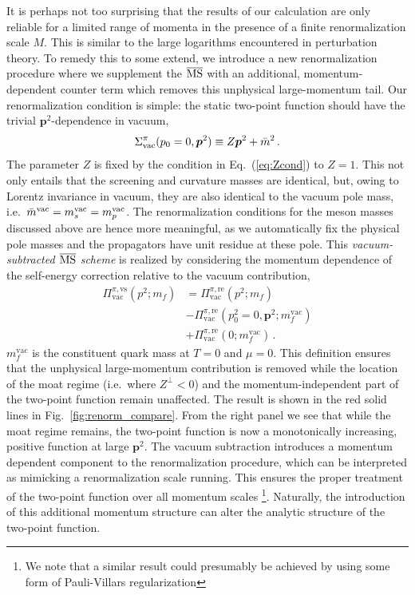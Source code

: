\documentclass[reprint,english,superscriptaddress,preprintnumbers,amsmath,amssymb,aps,prd]{revtex4-2}
\def\Eq#1{Eq.~(\ref{#1})}
\def\Fig#1{Fig.~\ref{#1}}
\begin{document}
It is perhaps not too surprising that the results of our calculation are only reliable for a limited range of momenta in the presence of a finite renormalization scale $M$. This is similar to the large logarithms encountered in perturbation theory. To remedy this to some extend, we introduce a new renormalization procedure where we supplement the $\overline{\rm MS}$ with an additional, momentum-dependent counter term which removes this unphysical large-momentum tail. Our renormalization condition is simple: the static two-point function should have the trivial $\boldsymbol{p}^2$-dependence in vacuum,
\begin{align}\label{eq:rc2}
    \Sigma_{\rm vac}^\pi(p_0 = 0, \boldsymbol{p}^2) \equiv Z \boldsymbol{p}^2 + \bar m^2\,.
\end{align}
The parameter $Z$ is fixed by the condition in \Eq{eq:Zcond} to $Z=1$.
This not only entails that the screening and curvature masses are identical, but, owing to Lorentz invariance in vacuum, they are also identical to the vacuum pole mass, i.e.\ $\bar m^{\rm vac} = m_s^{\rm vac} = m_p^{\rm vac}$. The renormalization conditions for the meson masses discussed above are hence more meaningful, as we automatically fix the physical pole masses and the propagators have unit residue at these pole. This \emph{vacuum-subtracted $\overline{\rm MS}$ scheme} is realized by considering the momentum dependence of the self-energy correction relative to the vacuum contribution,
%
\begin{align}\label{eq:two_point_re2}
\nonumber 
 \Pi^{\pi,\mathrm{vs}}_{\mathrm{vac}}(p^2;m_f)&=\Pi^{\pi,\mathrm{re}}_{\mathrm{vac}}(p^2;m_f)\\[2ex] \nonumber
 &-\Pi^{\pi,\mathrm{re}}_{\mathrm{vac}}(p^2_0=0,\boldsymbol{p}^2;m_f^{\mathrm{vac}})\\[2ex]
 &+\Pi^{\pi,\mathrm{re}}_{\mathrm{vac}}(0;m_f^{\mathrm{vac}})\,.
\end{align}
%
$m_f^{\mathrm{vac}}$ is the constituent quark mass at $T=0$ and $\mu=0$. This definition ensures that the unphysical large-momentum contribution is removed while the location of the moat regime (i.e.\, where $Z^\perp <0$) and the momentum-independent part of the two-point function remain unaffected. The result is shown in the red solid lines in \Fig{fig:renorm_compare}. From the right panel we see that while the moat regime remains, the two-point function is now a monotonically increasing, positive function at large $\boldsymbol{p}^2$. The vacuum subtraction introduces a momentum dependent component to the renormalization procedure, which can be interpreted as mimicking a renormalization scale running. This ensures the proper treatment of the two-point function over all momentum scales \footnote{We note that a similar result could presumably be achieved by using some form of Pauli-Villars regularization}. Naturally, the introduction of this additional momentum structure can alter the analytic structure of the two-point function.
\end{document}
